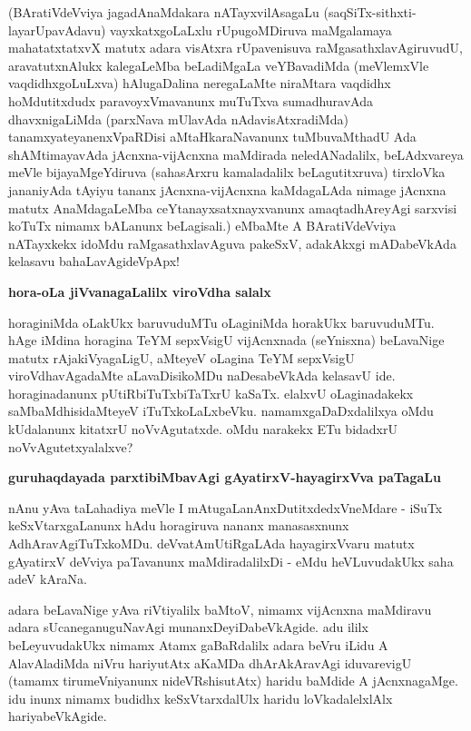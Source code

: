\noindent
(BAratiVdeVviya jagadAnaMdakara nATayxvilAsagaLu (saqSiTx-sithxti-layarUpa\break\-vAdavu) vayxkatx\-goLaLxlu rUpugoMDiruva maMgalamaya mahatatxtatxvX matutx adara visAtxra rUpavenisuva raMgasathxlavAgiru\-vudU, aravatutxnAlukx kalegaLeMba beLa\-diMgaLa veYBavadiMda (meVlemxVle vaqdidhxgoLuLxva) hAlu\-gaDa\-lina neregaLaMte niraMtara vaqdidhx hoMdutitxdudx paravoyxVmavanunx muTuTxva sumadhuravAda dhavxnigaLiMda (parxNava mUla\-vAda nAdavisAtxradiMda) tanamxyateyanenxVpaRDisi aMtaHkaraNavanunx tuMbuvaMthadU Ada shAMtimaya\-vAda jAcnxna-vijAcnxna maMdirada neledANadalilx, beLAdxvareya meVle bijayaMgeYdiruva (saha\-sArxru kamala\-dalilx beLagutitxruva) tirxloVka jananiyAda tAyiyu tananx jAcnxna-vijAcnxna kaMda\-gaLAda nimage jAcnxna matutx AnaMdagaLeMba ceYtanayxsatxnayxvanunx amaqtadhAreyAgi sarxvisi koTuTx nimamx bALanunx beLagisali.) eMbaMte A BAratiVdeVviya nATayxkekx idoMdu raMgasathxlavAguva pakeSxV, adakAkxgi mADabeVkAda kelasavu bahaLa\-vAgideVpApx!

{\bigskip
\noindent
{\large\bf hora-oLa jiVvanagaLalilx viroVdha salalx}}\label{page201}
\medskip

\noindent
horaginiMda oLakUkx baruvuduMTu oLaginiMda horakUkx baruvuduMTu. hAge iMdina horagina TeYM sepxVsigU vijAcnxnada (seYnisxna) beLavaNige matutx rAjakiVya\-gaLigU, aMteyeV oLagina TeYM sepxVsigU viroVdhavAgadaMte aLavaDisikoMDu naDesabeVkAda kelasavU ide. horaginadanunx pUtiRbiTuTxbiTaTxrU kaSaTx. elalxvU oLaginadakekx saMbaMdhisidaMteyeV iTuTxkoLaLxbeVku. namamxgaDaDxdalilxya oMdu kUdalanunx kitatxrU noVvAgutatxde. oMdu narakekx ETu bidadxrU noVvAgutetxyalalxve?

{\bigskip
\noindent
{\large\bf guruhaqdayada parxtibiMbavAgi gAyatirxV-hayagirxVva paTagaLu}}\label{page76}
\medskip

\noindent
nAnu yAva taLahadiya meVle I mAtugaLanAnxDutitxdedxVneMdare - iSuTx keSxVtarx\-gaLanunx hAdu hora\-giruva nananx manasasxnunx AdhAravAgiTuTxkoMDu. deVvatA\-mUtiRgaLAda hayagirxVvaru matutx gAyatirxV deVviya paTavanunx maMdiradalilxDi - eMdu heVLuvudakUkx saha adeV kAraNa.

adara beLavaNige yAva riVtiyalilx baMtoV, nimamx vijAcnxna maMdiravu adara sUcaneganuguNa\-vAgi munanxDeyiDabeVkAgide. adu ililx beLeyuvudakUkx nimamx Atamx gaBaRdalilx adara beVru iLidu A Ala\-vAladiMda niVru hariyutAtx aKaMDa dhArAkAravAgi iduvarevigU (tamamx tirumeVniyanunx nideVR\-shisutAtx) haridu baMdide A jAcnxnagaMge. idu inunx nimamx budidhx keSxVtarxdalUlx haridu loVkadalelxlAlx hariyabeVkAgide.

